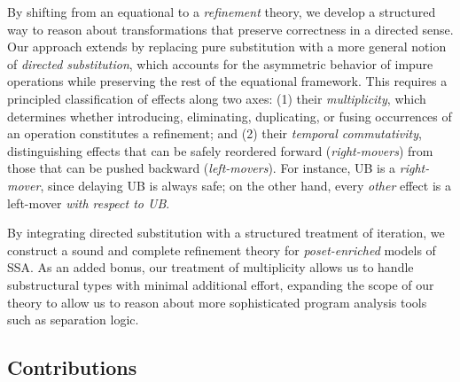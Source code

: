 \documentclass[acmsmall,screen,review]{acmart}
\begin{document}
By shifting from an equational to a \emph{refinement} theory, we develop a structured way to reason
about transformations that preserve correctness in a directed sense. Our approach extends
\citet{ghalayini-24-ssa-densem-arxiv} by replacing pure substitution with a more general notion of
\emph{directed substitution}, which accounts for the asymmetric behavior of impure operations while
preserving the rest of the equational framework. This requires a principled classification of
effects along two axes: (1) their \emph{multiplicity}, which determines whether introducing,
eliminating, duplicating, or fusing occurrences of an operation constitutes a refinement; and (2)
their \emph{temporal commutativity}, distinguishing effects that can be safely reordered forward
(\emph{right-movers}) from those that can be pushed backward (\emph{left-movers}). For instance, UB
is a \emph{right-mover}, since delaying UB is always safe; on the other hand, every \emph{other}
effect is a left-mover \emph{with respect to UB}.

By integrating directed substitution with a structured treatment of iteration, we construct a sound
and complete refinement theory for \emph{poset-enriched} models of SSA. As an added bonus, our
treatment of multiplicity allows us to handle substructural types with minimal additional effort,
expanding the scope of our theory to allow us to reason about more sophisticated program analysis
tools such as separation logic.

\subsection{Contributions}
\end{document}
